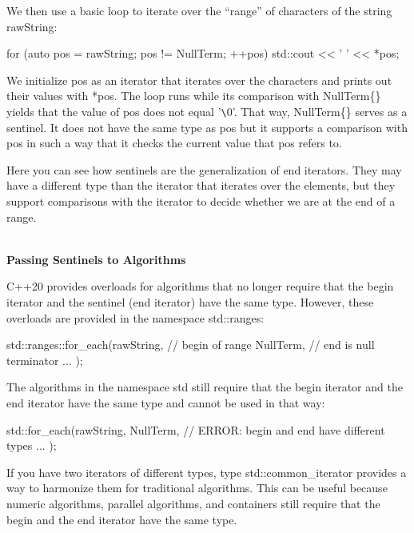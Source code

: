 We then use a basic loop to iterate over the “range” of characters of the string rawString:

\begin{cpp}
for (auto pos = rawString; pos != NullTerm{}; ++pos) {
	std::cout << ' ' << *pos;
}
\end{cpp}

We initialize pos as an iterator that iterates over the characters and prints out their values with *pos. The loop runs while its comparison with NullTerm\{\} yields that the value of pos does not equal ’\verb|\|0’. That way, NullTerm\{\} serves as a sentinel. It does not have the same type as pos but it supports a comparison with pos in such a way that it checks the current value that pos refers to.

Here you can see how sentinels are the generalization of end iterators. They may have a different type than the iterator that iterates over the elements, but they support comparisons with the iterator to decide whether we are at the end of a range.

\noindent
\hspace*{\fill} \\ %
\textbf{Passing Sentinels to Algorithms}

C++20 provides overloads for algorithms that no longer require that the begin iterator and the sentinel (end iterator) have the same type. However, these overloads are provided in the namespace std::ranges:

\begin{cpp}
std::ranges::for_each(rawString, // begin of range
						NullTerm{}, // end is null terminator
						... );
\end{cpp}

The algorithms in the namespace std still require that the begin iterator and the end iterator have the same type and cannot be used in that way:

\begin{cpp}
std::for_each(rawString, NullTerm{}, // ERROR: begin and end have different types
			... );
\end{cpp}

If you have two iterators of different types, type std::common\_iterator provides a way to harmonize them for traditional algorithms. This can be useful because numeric algorithms, parallel algorithms, and containers still require that the begin and the end iterator have the same type.


